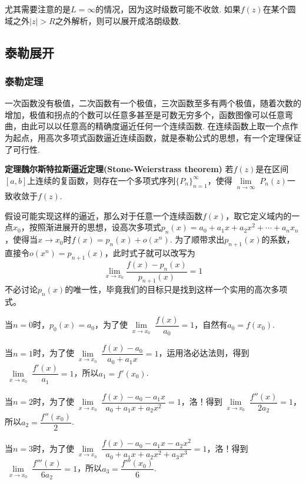 \documentclass[UTF8]{ctexart}
\newenvironment{theorem}[1]
    {\begin{tcolorbox}[enhanced, colback=LightYellow, breakable=true, frame hidden, borderline west={1.5mm}{-2mm}{DarkBlue}]
    {\bfseries {\color{DarkBlue} 定理}\quad #1} \newline}
    {\end{tcolorbox}}
\begin{document}
尤其需要注意的是\(L=\infty\)的情况，因为这时级数可能不收敛. 如果\(f(z)\)在某个圆域之外\(|z| > R\)之外解析，则可以展开成洛朗级数.

\subsection{泰勒展开}

\subsubsection{泰勒定理}

一次函数没有极值，二次函数有一个极值，三次函数至多有两个极值，随着次数的增加，极值和拐点的个数可以任意多甚至是可数无穷多个，函数图像可以任意弯曲，由此可以以任意高的精确度逼近任何一个连续函数. 在连续函数上取一个点作为起点，用高次多项式函数逼近连续函数，就是泰勒公式的思想，有一个定理保证了可行性.

\begin{theorem}{魏尔斯特拉斯逼近定理(Stone-Weierstrass theorem)}
    若\(f(z)\)是在区间\([a,b]\)上连续的复函数，则存在一个多项式序列\(\{P_n\}_{n=1}^{\infty}\)，使得\(\lim \limits_{\substack{n \to \infty}} P_n(z)\)一致收敛于\(f(z)\).
\end{theorem}

假设可能实现这样的逼近，那么对于任意一个连续函数\(f(x)\)，取它定义域内的一点\(x_0\)，按照渐进展开的思想，设高次多项式\(p_n(x)=a_0+a_1x+a_2x^2+\cdots+a_nx_n\)，使得当\(x \to x_0\)时\(f(x)=p_n(x)+o(x^n)\). 为了顺带求出\(p_{n+1}(x)\)的系数，直接令\(o(x^n)=p_{n+1}(x)\)，此时式子就可以改写为
\[\lim_{x \to x_0}\frac{f(x)-p_n(x)}{p_{n+1}(x)} = 1 \]
不必讨论\(p_n(x)\)的唯一性，毕竟我们的目标只是找到这样一个实用的高次多项式。

当\(n=0\)时，\(p_0(x)=a_0\)，为了使\(\lim \limits_{\substack{x\to x_0}}\dfrac{f(x)}{a_0}=1\)，自然有\(a_0=f(x_0)\).

当\(n=1\)时，为了使\(\lim \limits_{\substack{x\to x_0}}\dfrac{f(x)-a_0}{a_0+a_1x}=1\)，运用洛必达法则，得到\(\lim \limits_{\substack{x\to x_0}}\dfrac{f'(x)}{a_1}=1\)，所以\(a_1=f'(x_0)\).

当\(n=2\)时，为了使\(\lim \limits_{\substack{x\to x_0}}\dfrac{f(x)-a_0-a_1x}{a_0+a_1x+a_2x^2}=1\)，洛！得到\(\lim \limits_{\substack{x\to x_0}}\dfrac{f''(x)}{2a_2}=1\)，所以\(a_2=\dfrac{f''(x_0)}{2}\).

当\(n=3\)时，为了使\(\lim \limits_{\substack{x\to x_0}}\dfrac{f(x)-a_0-a_1x-a_2x^2}{a_0+a_1x+a_2x^2+a_3x^3}=1\)，洛！得到\(\lim \limits_{\substack{x\to x_0}}\dfrac{f'''(x)}{6a_2}=1\)，所以\(a_3=\dfrac{f'''(x_0)}{6}\).
\end{document}

